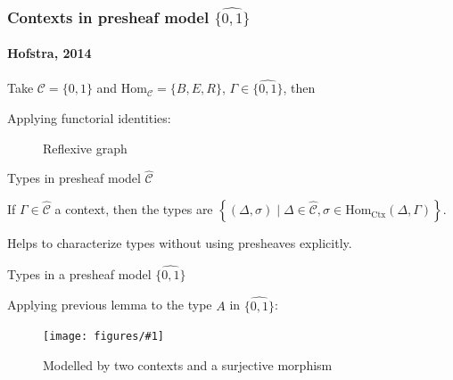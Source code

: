 \documentclass[english,draft]{beamer}
\newcommand{\fig}[2]{
    \begin{figure}\begin{center}\texttt{[image: figures/\#1]}\caption{#2\label{#1}}\end{center}
    \end{figure}}
\newcommand{\tcol}[2]{
    \begin{columns}
        \column{.5\textwidth}
        #1
        \column{.5\textwidth}
        #2
    \end{columns}
}
\begin{document}
   \begin{frame}[fragile]
   \frametitle{Contexts in presheaf model $\widehat{\{0,1\}}$}
\framesubtitle{Hofstra, 2014}
    \begin{example}    
    Take $\mathcal{C} = \{0,1\}$ and $\text{Hom}_{\mathcal{C}}= \{B,E,R\}$, $\Gamma \in \widehat{\{0,1\}}$, then 
    
   
    
    Applying functorial identities:
    \begin{figure}
    \begin{centering}
        
    \end{centering}
    \caption{Reflexive graph}
    \end{figure}
   \end{example} 
\end{frame}

\begin{frame}{Types in  presheaf model $\widehat{\mathcal{C}}$}
    
    
    \begin{lemma}
        If $\Gamma \in \widehat{\mathcal{C}}$ a context, then the types are $ \left\{ (\Delta, \sigma) \mid \Delta \in \widehat{\mathcal{C}}, \sigma \in \text{Hom}_{\text{Ctx}}(\Delta , \Gamma) \right\}$.
     \end{lemma}

     
     Helps to characterize types without using presheaves explicitly.
\end{frame}


\begin{frame}{Types in a presheaf model $\widehat{\{0, 1 \}}$}
  \begin{example}
  Applying previous lemma to the type $A$ in $\widehat{\{0, 1 \}}$:
\fig{type_lemma}{Modelled by two contexts and a surjective morphism}
 \end{example}


\end{frame}
\end{document}
